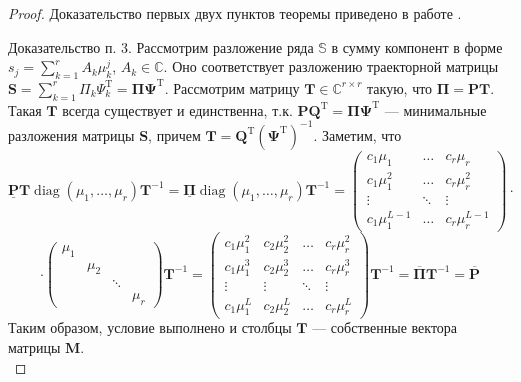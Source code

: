 \documentclass[specialist, substylefile = spbureport.rtx, subf,href,colorlinks=true, 12pt]{disser}
\theoremstyle{definition}
\DeclareMathOperator{\diag}{diag}
\begin{document}
\begin{proof}
Доказательство первых двух пунктов теоремы приведено в работе \cite{Huffel94}.

Доказательство п. 3. Рассмотрим разложение ряда $\mathbb{S}$ в сумму компонент в форме $s_j = \sum_{k = 1}^{r}A_k\mu_k^j$, $A_k \in \mathbb{C}$. Оно соответствует разложению траекторной матрицы $\mathbf{S} = \sum_{k = 1}^{r}\Pi_k\Psi_k^{\mathrm{T}} = \mathbf{\Pi\Psi}^{\mathrm{T}}$. Рассмотрим матрицу $\mathbf{T} \in \mathbb{C}^{r \times r}$ такую, что $\mathbf{\Pi} = \mathbf{PT}$. Такая $\mathbf{T}$ всегда существует и единственна, т.к. $\mathbf{PQ}^{\mathrm{T}} = \mathbf{\Pi\Psi}^{\mathrm{T}}$ --- минимальные разложения матрицы $\mathbf{S}$, причем $\mathbf{T} = \mathbf{Q}^{\mathrm{T}}(\mathbf{\Psi}^{\mathrm{T}})^{-1}$. Заметим, что
\begin{equation*}
   \underline{\mathbf{P}}\mathbf{T}\diag (\mu_1, \ldots, \mu_r)\mathbf{T}^{-1} = \underline{\mathbf{\Pi}}\diag (\mu_1, \ldots, \mu_r)\mathbf{T}^{-1} = \begin{pmatrix}
        c_1\mu_1& \dots& c_r\mu_r \\
        c_1\mu_1^2& \dots& c_r\mu_r^2 \\
        \vdots& \ddots& \vdots \\
        c_1\mu_1^{L - 1}& \dots& c_r\mu_r^{L - 1}
   \end{pmatrix} \cdot
\end{equation*}
\begin{equation*}
\cdot
    \begin{pmatrix}
        \mu_1 & & & \\
        & \mu_2 & & \\
        & & \ddots & \\
        & & & \mu_r
    \end{pmatrix}
    \mathbf{T}^{-1} = \begin{pmatrix}
        c_1\mu_1^2 & c_2\mu_2^2 & \dots & c_r\mu_r^2 \\
        c_1\mu_1^3 & c_2\mu_2^3 & \dots & c_r\mu_r^3 \\
        \vdots & \vdots & \ddots & \vdots \\
        c_1\mu_1^L & c_2\mu_2^L & \dots & c_r\mu_r^L
    \end{pmatrix}
    \mathbf{T}^{-1} = \overline{\mathbf{\Pi}}\mathbf{T}^{-1} = \overline{\mathbf{P}}
\end{equation*}
Таким образом, условие выполнено и столбцы $\mathbf{T}$ --- собственные вектора матрицы $\mathbf{M}$. \\

\end{proof}
\end{document}
